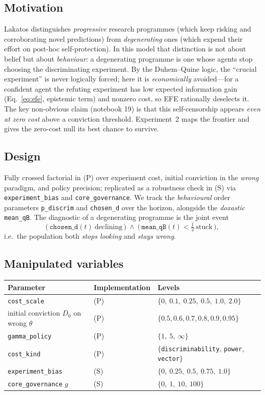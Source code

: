 \documentclass[11pt]{article}
\newcommand{\code}[1]{\texttt{#1}}
\newcommand{\param}[1]{\texttt{#1}}
\begin{document}
\subsection{Motivation}
Lakatos \cite{lakatos1970methodology} distinguishes \emph{progressive} research
programmes (which keep risking and corroborating novel predictions) from
\emph{degenerating} ones (which expend their effort on post-hoc self-protection).
In this model that distinction is not about belief but about \emph{behaviour}: a
degenerating programme is one whose agents stop choosing the discriminating
experiment. By the Duhem--Quine logic, the ``crucial experiment'' is never
logically forced; here it is \emph{economically} avoided---for a confident agent
the refuting experiment has low expected information gain (Eq.~\ref{eq:efe},
epistemic term) and nonzero cost, so EFE rationally deselects it. The key
non-obvious claim (notebook 19) is that this self-censorship appears \emph{even at
zero cost} above a conviction threshold. Experiment~2 maps the frontier and gives
the zero-cost null its best chance to survive.

\subsection{Design}
Fully crossed factorial in (P) over experiment cost, initial conviction in the
\emph{wrong} paradigm, and policy precision; replicated as a robustness check in
(S) via \param{experiment\_bias} and \param{core\_governance}. We track the
\emph{behavioural} order parameters \param{p\_discrim} and \param{chosen\_d} over
the horizon, alongside the \emph{doxastic} \param{mean\_qB}. The diagnostic of a
degenerating programme is the joint event
\[
\big(\,\param{chosen\_d}(t)\ \text{declining}\,\big)\ \wedge\ \big(\,\param{mean\_qB}(t)<\tfrac12\ \text{stuck}\,\big),
\]
i.e.\ the population both \emph{stops looking} and \emph{stays wrong}.

\subsection{Manipulated variables}
\begin{center}
\begin{tabular}{@{}lll@{}}
\toprule
Parameter & Implementation & Levels \\
\midrule
\param{cost\_scale} & (P) & $\{0,\ 0.1,\ 0.25,\ 0.5,\ 1.0,\ 2.0\}$ \\
initial conviction $D_0$ on wrong $\theta$ & (P) & $\{0.5, 0.6, 0.7, 0.8, 0.9, 0.95\}$ \\
\param{gamma\_policy} & (P) & $\{1,\ 5,\ \infty\}$ \\
\param{cost\_kind} & (P) & $\{$\code{discriminability}, \code{power}, \code{vector}$\}$ \\
\param{experiment\_bias} & (S) & $\{0,\ 0.25,\ 0.5,\ 0.75,\ 1.0\}$ \\
\param{core\_governance} $g$ & (S) & $\{0,\ 1,\ 10,\ 100\}$ \\
\bottomrule
\end{tabular}
\end{center}
\end{document}
